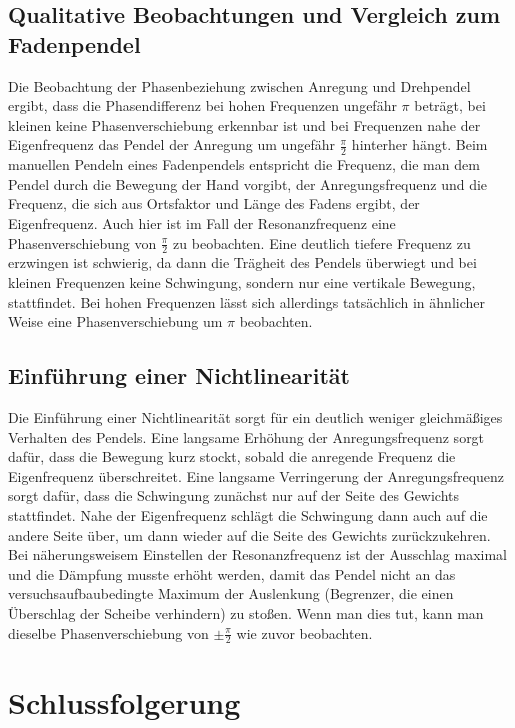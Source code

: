 \documentclass[
	a4paper,
	12pt,
	pagesize,
	ngerman
]{scrartcl}
\begin{document}
	\subsection{Qualitative Beobachtungen und Vergleich zum Fadenpendel}
	Die Beobachtung der Phasenbeziehung zwischen Anregung und Drehpendel ergibt, dass die Phasendifferenz bei hohen Frequenzen ungefähr $ \pi $  beträgt, bei kleinen keine Phasenverschiebung erkennbar ist und bei Frequenzen nahe der Eigenfrequenz das Pendel der Anregung um ungefähr $ \frac{\pi}{2} $ hinterher hängt. Beim manuellen Pendeln eines Fadenpendels entspricht die Frequenz, die man dem Pendel durch die Bewegung der Hand vorgibt, der Anregungsfrequenz und die Frequenz, die sich aus Ortsfaktor und Länge des Fadens ergibt, der Eigenfrequenz. Auch hier ist im Fall der Resonanzfrequenz eine Phasenverschiebung von $  \frac{\pi}{2} $ zu beobachten. Eine deutlich tiefere Frequenz zu erzwingen ist schwierig, da dann die Trägheit des Pendels überwiegt und bei kleinen Frequenzen keine Schwingung, sondern nur eine vertikale Bewegung, stattfindet. Bei hohen Frequenzen lässt sich allerdings tatsächlich in ähnlicher Weise eine Phasenverschiebung um $ \pi $ beobachten.
	\subsection{Einführung einer Nichtlinearität}
	Die Einführung einer Nichtlinearität sorgt für ein deutlich weniger gleichmäßiges Verhalten des Pendels. Eine langsame Erhöhung der Anregungsfrequenz sorgt dafür, dass die Bewegung kurz stockt, sobald die anregende Frequenz die Eigenfrequenz überschreitet. Eine langsame Verringerung der Anregungsfrequenz sorgt dafür, dass die Schwingung zunächst nur auf der Seite des Gewichts stattfindet. Nahe der Eigenfrequenz schlägt die Schwingung dann auch auf die andere Seite über, um dann wieder auf die Seite des Gewichts zurückzukehren. Bei näherungsweisem Einstellen der Resonanzfrequenz ist der Ausschlag maximal und die Dämpfung musste erhöht werden, damit das Pendel nicht an das versuchsaufbaubedingte Maximum der Auslenkung (Begrenzer, die einen Überschlag der Scheibe verhindern) zu stoßen. Wenn man dies tut, kann man dieselbe Phasenverschiebung von $ \pm \frac{\pi}{2} $ wie zuvor beobachten.
	\section{Schlussfolgerung}
	
\end{document}
